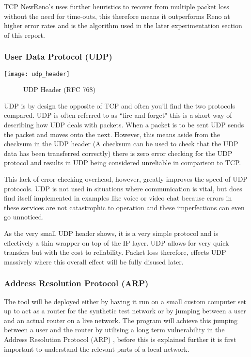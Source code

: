 TCP NewReno's uses further heuristics to recover from multiple packet loss without the need for time-outs, this therefore means it outperforms Reno at higher error rates and is the algorithm used in the later experimentation section of this report.

\clearpage
\subsubsection{User Data Protocol (UDP)}
\begin{center}
	\texttt{[image: udp\_header]}
	\begin{figure}[h]
		\caption{UDP Header (RFC 768)}
	\end{figure}		
\end{center}

UDP is by design the opposite of TCP and often you'll find the two protocols compared. UDP is often referred to as ``fire and forget" \citep{kempf2011thoughts} this is a short way of describing how UDP deals with packets. When a packet is to be sent UDP sends the packet and moves onto the next. However, this means aside from the checksum in the UDP header (A checksum can be used to check that the UDP data has been transferred correctly) there is zero error checking for the UDP protocol and results in UDP being considered unreliable in comparison to TCP. 

This lack of error-checking overhead, however, greatly improves the speed of UDP protocols. UDP is not used in situations where communication is vital, but does find itself implemented in examples like voice or video chat because errors in these services are not catastrophic to operation and these imperfections can even go unnoticed.

As the very small UDP header shows, it is a very simple protocol and is effectively a thin wrapper on top of the IP layer. UDP allows for very quick transfers but with the cost to reliability. Packet loss therefore, effects UDP massively where this overall effect will be fully disused later.

\clearpage
\subsubsection{Address Resolution Protocol (ARP)}
The tool will be deployed either by having it run on a small custom computer set up to act as a router for the synthetic test network or by jumping between a user and an actual router on a live network. The program will achieve this jumping between a user and the router by utilising a long term vulnerability in the Address Resolution Protocol (ARP) \citep{arp2001}, before this is explained further it is first important to understand the relevant parts of a local network.

